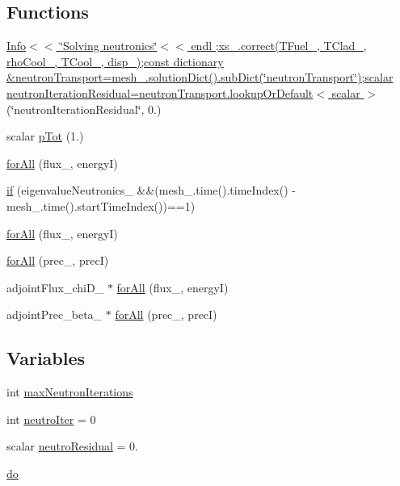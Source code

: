 \subsection*{Functions}
\begin{DoxyCompactItemize}
\item 
\hyperlink{solveNeutronicsAdjoint_8H_a18e7df8b8040f0db71972c2623f7994d}{Info$<$$<$ \char`\"{}\+Solving neutronics\char`\"{}$<$$<$ endl ;xs\+\_\+.\+correct(\+T\+Fuel\+\_\+, T\+Clad\+\_\+, rho\+Cool\+\_\+, T\+Cool\+\_\+, disp\+\_\+);const dictionary \&neutron\+Transport=mesh\+\_\+.\+solution\+Dict().\+sub\+Dict(\char`\"{}neutron\+Transport\char`\"{});scalar neutron\+Iteration\+Residual=neutron\+Transport.\+lookup\+Or\+Default$<$ scalar $>$} (\char`\"{}neutron\+Iteration\+Residual\char`\"{}, 0.)
\item 
scalar \hyperlink{solveNeutronicsAdjoint_8H_ae5591870910ae075926ced03a5923185}{p\+Tot} (1.)
\item 
\hyperlink{solveNeutronicsAdjoint_8H_a72f1858746fb864f8d04fe468bbd8465}{for\+All} (flux\+\_\+, energyI)
\item 
\hyperlink{solveNeutronicsAdjoint_8H_a8ccbcf3a22f674106ef4daebb7d1eb21}{if} (eigenvalue\+Neutronics\+\_\+ \&\&(mesh\+\_\+.\+time().time\+Index() -\/mesh\+\_\+.\+time().start\+Time\+Index())==1)
\item 
\hyperlink{fluxEqAdjoint_8H_a72f1858746fb864f8d04fe468bbd8465}{for\+All} (flux\+\_\+, energyI)
\item 
\hyperlink{precEqAdjoint_8H_a96d0351bc6016c4d07b9e688e5c1b865}{for\+All} (prec\+\_\+, precI)
\item 
adjoint\+Flux\+\_\+chi\+D\+\_\+ $\ast$ \hyperlink{initialize__adjointFlux__chiD_8H_aa51a88e769a92df082c3e73cd97391b9}{for\+All} (flux\+\_\+, energyI)
\item 
adjoint\+Prec\+\_\+beta\+\_\+ $\ast$ \hyperlink{initializeDelayedNeutroSourceAdjoint_8H_aa3899c89bc6049e9f369480880564780}{for\+All} (prec\+\_\+, precI)
\end{DoxyCompactItemize}
\subsection*{Variables}
\begin{DoxyCompactItemize}
\item 
int \hyperlink{solveNeutronicsAdjoint_8H_aeeb27a033c3d21cdfe4cc47565bc21a2}{max\+Neutron\+Iterations}
\item 
int \hyperlink{solveNeutronicsAdjoint_8H_a5ea48e0170faff29dfdd3cbba330d51d}{neutro\+Iter} = 0
\item 
scalar \hyperlink{solveNeutronicsAdjoint_8H_a2a3baa00ecfd5a47c6f6ba475a66d2c6}{neutro\+Residual} = 0.
\item 
\hyperlink{solveNeutronicsAdjoint_8H_a721c6ff80a6d3e4ad4ffa52a04c60085}{do}
\end{DoxyCompactItemize}


